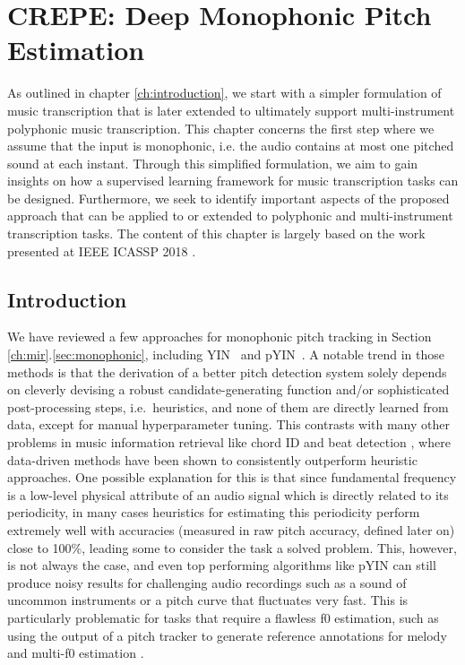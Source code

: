 
\graphicspath{{4-monophonic/figures/}}

\chapter{CREPE: Deep Monophonic Pitch Estimation}
\label{ch:monophonic}

As outlined in chapter \ref{ch:introduction}, we start with a simpler formulation of music transcription that is later extended to ultimately support multi-instrument polyphonic music transcription.
This chapter concerns the first step where we assume that the input is monophonic, i.e. the audio contains at most one pitched sound at each instant.
Through this simplified formulation, we aim to gain insights on how a supervised learning framework for music transcription tasks can be designed.
Furthermore, we seek to identify important aspects of the proposed approach that can be applied to or extended to polyphonic and multi-instrument transcription tasks.
The content of this chapter is largely based on the work presented at IEEE ICASSP 2018 \cite{kim2018crepe}.

\section{Introduction}\label{sec:introduction}

We have reviewed a few approaches for monophonic pitch tracking in Section \ref{ch:mir}.\ref{sec:monophonic}, including YIN~\cite{decheveigne2002yin} and pYIN~\cite{mauch2014pyin}.
A notable trend in those methods is that the derivation of a better pitch detection system solely depends on cleverly devising a robust candidate-generating function and/or sophisticated post-processing steps, i.e.~heuristics, and none of them are directly learned from data, except for manual hyperparameter tuning.
This contrasts with many other problems in music information retrieval like chord ID \cite{humphrey2012rethinking} and beat detection \cite{bock2011enhanced}, where data-driven methods have been shown to consistently outperform heuristic approaches.
One possible explanation for this is that since fundamental frequency is a low-level physical attribute of an audio signal which is directly related to its periodicity, in many cases heuristics for estimating this periodicity perform extremely well with accuracies (measured in raw pitch accuracy, defined later on) close to 100\%, leading some to consider the task a solved problem.
This, however, is not always the case, and even top performing algorithms like pYIN can still produce noisy results for challenging audio recordings such as a sound of uncommon instruments or a pitch curve that fluctuates very fast.
This is particularly problematic for tasks that require a flawless f0 estimation, such as using the output of a pitch tracker to generate reference annotations for melody and multi-f0 estimation \cite{salamon2017analysis,bittner2017deepsalience}.

